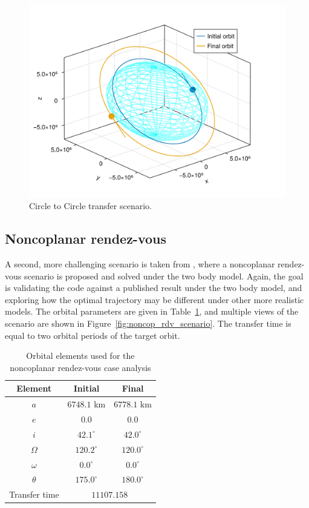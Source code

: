 \begin{figure}[htbp]
    \centering
    \includegraphics{../results/two_body/hohmann/scenario.png}
    \caption{Circle to Circle transfer scenario.}
    \label{fig:hohmann_scenario}
\end{figure}

\subsection{Noncoplanar rendez-vous}

A second, more challenging scenario is taken from , where a noncoplanar rendez-vous scenario is proposed and solved under the two body model. Again, the goal is validating the code against a published result under the two body model, and exploring how the optimal trajectory may be different under other more realistic models. The orbital parameters are given in Table~\ref{tab:noncop_rdv_orb_elems}, and multiple views of the scenario are shown in Figure~\ref{fig:noncop_rdv_scenario}. The transfer time is equal to two orbital periods of the target orbit.

\begin{table}[htbp]
    \centering
    \begin{tabular}{ccc} \toprule
        Element & Initial & Final \\ \midrule
        \(a\)      & \(6748.1\) km         & \(6778.1\) km   \\
        \(e\)      & \(0.0\)            & \(0.0\)        \\
        \(i\)      & \(42.1^\circ\)      & \(42.0^\circ\) \\
        \(\Omega\) & \(120.2^\circ\)   & \(120.0^\circ\)  \\
        \(\omega\) & \(0.0^\circ\)  & \(0.0^\circ\)  \\
        \(\theta\) & \(175.0^\circ\)  & \(180.0^\circ\)  \\ 
        Transfer time & \multicolumn{2}{c}{\(11107.158\)} \\\bottomrule
    \end{tabular}
    \caption{Orbital elements used for the noncoplanar rendez-vous case analysis}
    \label{tab:noncop_rdv_orb_elems}
\end{table}


